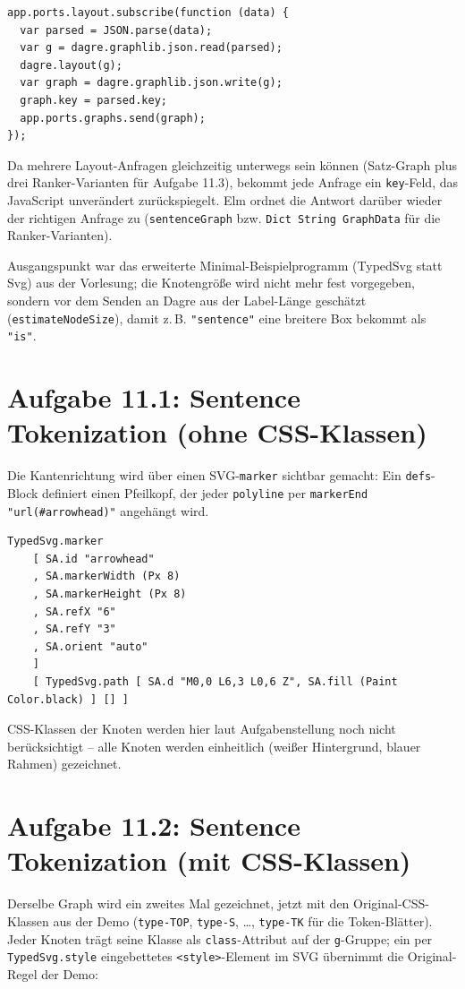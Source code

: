 \documentclass[11pt,a4paper]{article}
\begin{document}
\begin{verbatim}
app.ports.layout.subscribe(function (data) {
  var parsed = JSON.parse(data);
  var g = dagre.graphlib.json.read(parsed);
  dagre.layout(g);
  var graph = dagre.graphlib.json.write(g);
  graph.key = parsed.key;
  app.ports.graphs.send(graph);
});
\end{verbatim}

Da mehrere Layout-Anfragen gleichzeitig unterwegs sein können (Satz-Graph
plus drei Ranker-Varianten für Aufgabe 11.3), bekommt jede Anfrage ein
\texttt{key}-Feld, das JavaScript unverändert zurückspiegelt. Elm ordnet die
Antwort darüber wieder der richtigen Anfrage zu (\texttt{sentenceGraph} bzw.
\texttt{Dict String GraphData} für die Ranker-Varianten).

Ausgangspunkt war das erweiterte Minimal-Beispielprogramm (TypedSvg statt
Svg) aus der Vorlesung; die Knotengröße wird nicht mehr fest vorgegeben,
sondern vor dem Senden an Dagre aus der Label-Länge geschätzt
(\texttt{estimateNodeSize}), damit z.\,B. \texttt{"sentence"} eine breitere
Box bekommt als \texttt{"is"}.

\section*{Aufgabe 11.1: Sentence Tokenization (ohne CSS-Klassen)}

Die Kantenrichtung wird über einen SVG-\texttt{marker} sichtbar gemacht: Ein
\texttt{defs}-Block definiert einen Pfeilkopf, der jeder \texttt{polyline}
per \texttt{markerEnd "url(\#arrowhead)"} angehängt wird.

\begin{verbatim}
TypedSvg.marker
    [ SA.id "arrowhead"
    , SA.markerWidth (Px 8)
    , SA.markerHeight (Px 8)
    , SA.refX "6"
    , SA.refY "3"
    , SA.orient "auto"
    ]
    [ TypedSvg.path [ SA.d "M0,0 L6,3 L0,6 Z", SA.fill (Paint Color.black) ] [] ]
\end{verbatim}

CSS-Klassen der Knoten werden hier laut Aufgabenstellung noch nicht
berücksichtigt -- alle Knoten werden einheitlich (weißer Hintergrund, blauer
Rahmen) gezeichnet.

\section*{Aufgabe 11.2: Sentence Tokenization (mit CSS-Klassen)}

Derselbe Graph wird ein zweites Mal gezeichnet, jetzt mit den Original-CSS-Klassen
aus der Demo (\texttt{type-TOP}, \texttt{type-S}, \ldots, \texttt{type-TK} für
die Token-Blätter). Jeder Knoten trägt seine Klasse als \texttt{class}-Attribut
auf der \texttt{g}-Gruppe; ein per \texttt{TypedSvg.style} eingebettetes
\texttt{<style>}-Element im SVG übernimmt die Original-Regel der Demo:
\end{document}
